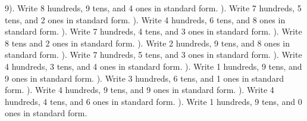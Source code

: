\documentclass{article}%
\begin{document}
9). Write 8 hundreds, 9 tens, and 4 ones in standard form.%
\newline%
\newline%
). Write 7 hundreds, 5 tens, and 2 ones in standard form.%
\newline%
\newline%
). Write 4 hundreds, 6 tens, and 8 ones in standard form.%
\newline%
\newline%
). Write 7 hundreds, 4 tens, and 3 ones in standard form.%
\newline%
\newline%
). Write 8 tens and 2 ones in standard form.%
\newline%
\newline%
). Write 2 hundreds, 9 tens, and 8 ones in standard form.%
\newline%
\newline%
). Write 7 hundreds, 5 tens, and 3 ones in standard form.%
\newline%
\newline%
). Write 4 hundreds, 3 tens, and 4 ones in standard form.%
\newline%
\newline%
). Write 1 hundreds, 9 tens, and 9 ones in standard form.%
\newline%
\newline%
). Write 3 hundreds, 6 tens, and 1 ones in standard form.%
\newline%
\newline%
). Write 4 hundreds, 9 tens, and 9 ones in standard form.%
\newline%
\newline%
). Write 4 hundreds, 4 tens, and 6 ones in standard form.%
\newline%
\newline%
). Write 1 hundreds, 9 tens, and 0 ones in standard form.%
\newline%
\end{document}
